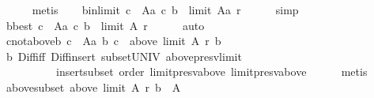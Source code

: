 \begin{isabellebody}
\ \ \ \ \isamarkupfalse%
\ metis\isanewline
\ \ \isamarkupfalse%
\ b{\isacharunderscore}{\kern0pt}in{\isacharunderscore}{\kern0pt}limit{\isacharcolon}{\kern0pt}\ {\isachardoublequoteopen}{\isasymforall}c\ {\isasymin}\ A{\isacharminus}{\kern0pt}{\isacharbraceleft}{\kern0pt}a{\isacharbraceright}{\kern0pt}{\isachardot}{\kern0pt}\ {\isacharparenleft}{\kern0pt}c{\isacharcomma}{\kern0pt}\ b{\isacharparenright}{\kern0pt}\ {\isasymin}\ limit\ {\isacharparenleft}{\kern0pt}A{\isacharminus}{\kern0pt}{\isacharbraceleft}{\kern0pt}a{\isacharbraceright}{\kern0pt}{\isacharparenright}{\kern0pt}\ r{\isachardoublequoteclose}\isanewline
\ \ \ \ \isamarkupfalse%
\ simp\isanewline
\ \ \isamarkupfalse%
\ b{\isacharunderscore}{\kern0pt}best{\isacharcolon}{\kern0pt}\ {\isachardoublequoteopen}{\isasymforall}c\ {\isasymin}\ A{\isacharminus}{\kern0pt}{\isacharbraceleft}{\kern0pt}a{\isacharbraceright}{\kern0pt}{\isachardot}{\kern0pt}\ {\isacharparenleft}{\kern0pt}c{\isacharcomma}{\kern0pt}\ b{\isacharparenright}{\kern0pt}\ {\isasymin}\ limit\ A\ r{\isachardoublequoteclose}\isanewline
\ \ \ \ \isamarkupfalse%
\ auto\isanewline
\ \ \isamarkupfalse%
\ c{\isacharunderscore}{\kern0pt}not{\isacharunderscore}{\kern0pt}above{\isacharunderscore}{\kern0pt}b{\isacharcolon}{\kern0pt}\ {\isachardoublequoteopen}{\isasymforall}c\ {\isasymin}\ A{\isacharminus}{\kern0pt}{\isacharbraceleft}{\kern0pt}a{\isacharcomma}{\kern0pt}\ b{\isacharbraceright}{\kern0pt}{\isachardot}{\kern0pt}\ c\ {\isasymnotin}\ above\ {\isacharparenleft}{\kern0pt}limit\ A\ r{\isacharparenright}{\kern0pt}\ b{\isachardoublequoteclose}\isanewline
\ \ \ \ \isamarkupfalse%
\ b\ Diff{\isacharunderscore}{\kern0pt}iff\ Diff{\isacharunderscore}{\kern0pt}insert{}\ subset{\isacharunderscore}{\kern0pt}UNIV\ above{\isacharunderscore}{\kern0pt}presv{\isacharunderscore}{\kern0pt}limit\isanewline
\ \ \ \ \ \ \ \ \ \ insert{\isacharunderscore}{\kern0pt}subset\ order\ limit{\isacharunderscore}{\kern0pt}presv{\isacharunderscore}{\kern0pt}above\ limit{\isacharunderscore}{\kern0pt}presv{\isacharunderscore}{\kern0pt}above{}\isanewline
\ \ \ \ \isamarkupfalse%
\ metis\isanewline
\ \ \isamarkupfalse%
\ \isamarkupfalse%
\ above{\isacharunderscore}{\kern0pt}subset{\isacharcolon}{\kern0pt}\ {\isachardoublequoteopen}above\ {\isacharparenleft}{\kern0pt}limit\ A\ r{\isacharparenright}{\kern0pt}\ b\ {\isasymsubseteq}\ A{\isachardoublequoteclose}\isanewline
\ \ \ \ \isamarkupfalse%

\end{isabellebody}
